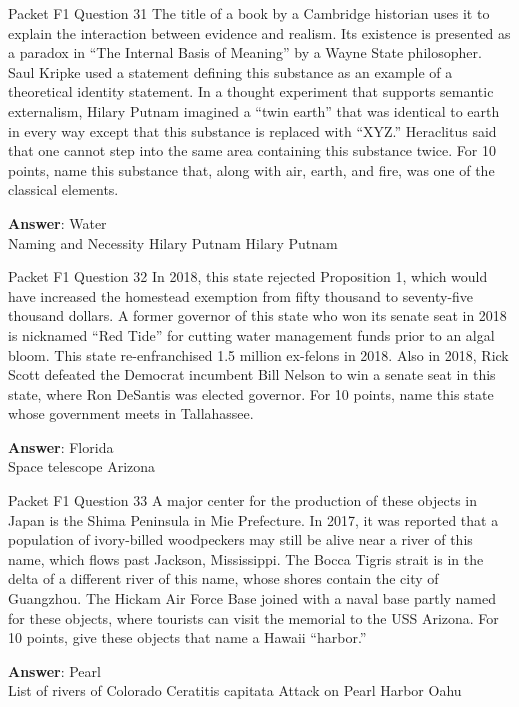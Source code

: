 \begin{frame}{Packet F1 Question 31}
The title of a book by a Cambridge historian uses it to explain the interaction between evidence and realism. Its existence is presented as a paradox in ``The Internal Basis of Meaning'' by a Wayne State philosopher. Saul Kripke used a statement defining this substance as an example   of a theoretical identity   statement. In a thought experiment that supports semantic externalism, Hilary   Putnam imagined a “twin earth” that   was identical to earth in every way except that this substance is replaced with   “XYZ.” Heraclitus said that one cannot step into the same area containing this substance twice. For 10 points, name this substance that, along with air, earth,   and fire, was one of the classical elements.

\textbf{Answer}: Water\\
 Naming and Necessity
 Hilary Putnam
 Hilary Putnam
\end{frame}

\begin{frame}{Packet F1 Question 32}
In 2018, this state rejected   Proposition 1, which would have increased the homestead exemption from fifty thousand to seventy-five thousand dollars. A former governor of this state who won its senate seat in 2018 is nicknamed “Red Tide” for cutting water management funds prior to an algal bloom. This state re-enfranchised 1.5 million ex-felons in 2018. Also in 2018, Rick Scott defeated     the Democrat   incumbent Bill Nelson to win a senate seat in this state, where Ron DeSantis was   elected governor. For 10 points, name this state whose government meets in Tallahassee.

\textbf{Answer}: Florida\\
 Space telescope
 Arizona
\end{frame}

\begin{frame}{Packet F1 Question 33}
A major center for the production of these objects in Japan is the Shima Peninsula in Mie Prefecture. In 2017, it was reported that a population of ivory-billed woodpeckers may still be alive near a river of this name, which flows past Jackson, Mississippi. The Bocca Tigris strait is in the delta of a different river of this name, whose shores   contain the city of Guangzhou. The Hickam Air Force Base joined with a naval base partly named for these objects, where tourists can visit the memorial to the USS Arizona. For 10 points, give these objects that name a Hawaii “harbor.”      

\textbf{Answer}: Pearl\\
 List of rivers of Colorado
 Ceratitis capitata
 Attack on Pearl Harbor
 Oahu
\end{frame}

